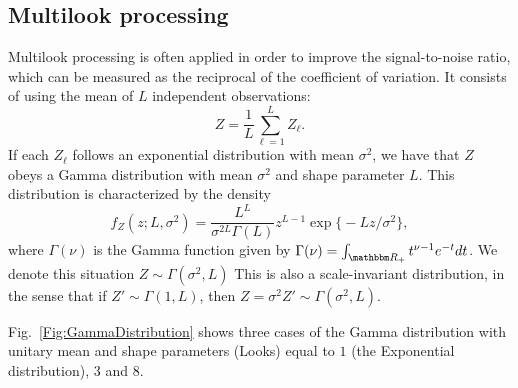 \documentclass{beamer}
\begin{document}
\subsection{Multilook processing}
\begin{frame}

Multilook processing is often applied in order to improve the signal-to-noise ratio, which can be measured as the reciprocal of the coefficient of variation.
It consists of using the mean of $L$ independent observations:
\begin{equation}
Z = \frac1L \sum_{\ell=1}^{L} Z_\ell.
\end{equation}
If each $Z_\ell$ follows an exponential distribution with mean $\sigma^2$, we have that $Z$ obeys a Gamma distribution with mean $\sigma^2$ and shape parameter $L$.
This distribution is characterized by the density
\begin{equation}
f_Z(z;L,\sigma^2) = \frac{L^L}{\sigma^{2L}\Gamma(L)} z^{L-1} 
	\exp\big\{ -L z / \sigma^2
	\big\},
	\label{eq:SARGammaDensity}
\end{equation}
where $\Gamma(\nu)$ is the Gamma function given by $\Gamma(\nu)=\int_{\mathbbm R_+} t^{\nu-1} e^{-t} dt$.
We denote this situation $Z\sim\Gamma(\sigma^2,L)$
This is also a scale-invariant distribution, in the sense that if $Z'\sim\Gamma(1,L)$, then $Z=\sigma^2 Z'\sim \Gamma(\sigma^2,L)$.

Fig.~\ref{Fig:GammaDistribution} shows three cases of the Gamma distribution with unitary mean and shape parameters (Looks) equal to $1$ (the Exponential distribution), $3$ and $8$.



\end{frame}
\end{document}
